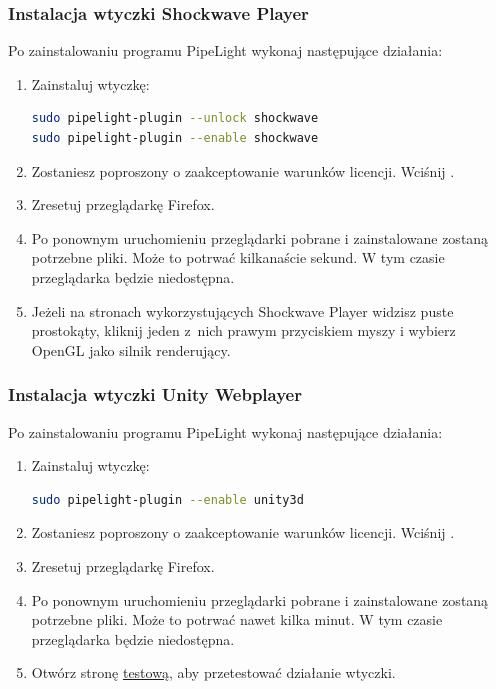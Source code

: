 \subsubsection{Instalacja wtyczki Shockwave Player}
\noindent Po zainstalowaniu programu PipeLight wykonaj następujące działania:
\begin{enumerate}
\item Zainstaluj wtyczkę:
\begin{lstlisting}[language=bash]
sudo pipelight-plugin --unlock shockwave
sudo pipelight-plugin --enable shockwave
\end{lstlisting}
\item Zostaniesz poproszony o zaakceptowanie warunków licencji. Wciśnij .
\item Zresetuj przeglądarkę Firefox.
\item Po ponownym uruchomieniu przeglądarki pobrane i zainstalowane zostaną potrzebne pliki. Może to potrwać kilkanaście sekund. W tym czasie przeglądarka będzie niedostępna.
\item Jeżeli na stronach wykorzystujących Shockwave Player widzisz puste prostokąty, kliknij jeden z~nich prawym przyciskiem myszy i wybierz \textcolor{ubuntu_orange}{OpenGL} jako silnik renderujący.
\end{enumerate}

\subsubsection{Instalacja wtyczki Unity Webplayer}
\noindent Po zainstalowaniu programu PipeLight wykonaj następujące działania:
\begin{enumerate}
\item Zainstaluj wtyczkę:
\begin{lstlisting}[language=bash]
sudo pipelight-plugin --enable unity3d
\end{lstlisting}
\item Zostaniesz poproszony o zaakceptowanie warunków licencji. Wciśnij .
\item Zresetuj przeglądarkę Firefox.
\item Po ponownym uruchomieniu przeglądarki pobrane i zainstalowane zostaną potrzebne pliki. Może to potrwać nawet kilka minut. W tym czasie przeglądarka będzie niedostępna.
\item Otwórz stronę \href{https://unity3d.com/showcase/live-demos}{testową}, aby przetestować działanie wtyczki.
\end{enumerate}

